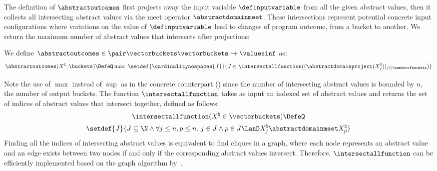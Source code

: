 The definition of $\abstractoutcomes$ first projects away the input variable $\definputvariable$ from all the given abstract values, then it collects all intersecting abstract values via the meet operator $\abstractdomainmeet$.
These intersections represent potential concrete input configurations where variations on the value of $\definputvariable$ lead to changes of program outcome, from a bucket to another.
We return the maximum number of abstract values that intersects after projections:
\begin{definition}
  We define $\abstractoutcomes\in\pair\vectorbuckets\vectorbuckets\to\valuesinf$ as:
  \begin{equation*}
  \abstractoutcomes(X^\natural, \buckets) \DefeQ \max~\setdef{\cardinalitynospaces{J}}{J \in \intersectallfunction((\abstractdomainproject(X^\natural_j))_{j\le\numberofbuckets})}
  \end{equation*}
\end{definition}
Note the use of $\max$ instead of $\sup$ as in the concrete counterpart () since the number of intersecting abstract values is bounded by $n$, the number of output buckets.
The function $\intersectallfunction$ takes as input an indexed set of abstract values and returns the set of indices of abstract values that intersect together, defined as follows:
\begin{gather*}
  \intersectallfunction(X^\natural\in\vectorbuckets) \DefeQ \\
  \setdef{J}{J \subseteq \N \land \forall j\le n, p\le n.~ j\in J \land p\in J \LanD X^\natural_j \abstractdomainmeet X^\natural_{p}}
\end{gather*}
Finding all the indices of intersecting abstract values is equivalent to find cliques in a graph, where each node represents an abstract value and an edge exists between two nodes if and only if the corresponding abstract values intersect.
Therefore, $\intersectallfunction$ can be efficiently implemented based on the graph algorithm by~.
%

